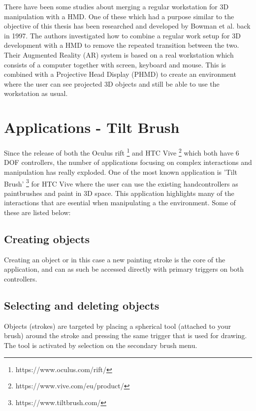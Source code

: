 There have been some studies about merging a regular workstation for 3D manipulation with a HMD. One of these which had a purpose similar to the objective of this thesis has been researched and developed by Bowman et al. back in 1997. \cite{relatedwork:kijimaand1997transition} The authors investigated how to combine a regular work setup for 3D development with a HMD to remove the repeated transition between the two. Their Augmented Reality (AR) system is based on a real workstation which consists of a computer together with screen, keyboard and mouse. This is combined with a Projective Head Display (PHMD) to create an environment where the user can see projected 3D objects and still be able to use the workstation as usual.
\section{Applications - Tilt Brush}
Since the release of both the Oculus rift \footnote{https://www.oculus.com/rift/} and HTC Vive \footnote{https://www.vive.com/eu/product/} which both have 6 DOF controllers, the number of applications focusing on complex interactions and manipulation has really exploded. One of the most known application is 'Tilt Brush' \footnote{https://www.tiltbrush.com/} for HTC Vive where the user can use the existing handcontrollers as paintbrushes and paint in 3D space. This application highlights many of the interactions that are esential when manipulating a the environment. Some of these are listed below:
\subsection{Creating objects}
Creating an object or in this case a new painting stroke is the core of the application, and can as such be accessed directly with primary triggers on both controllers.
\subsection{Selecting and deleting objects}
Objects (strokes) are targeted by placing a spherical tool (attached to your brush) around the stroke and pressing the same trigger that is used for drawing. The tool is activated by selection on the secondary brush menu.

